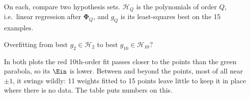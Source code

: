 \begin{center}
\end{center}

On each, compare two hypothesis sets. \(\mathcal{H}_Q\) is the polynomials of
order \(Q\), i.e.\ linear regression after \(\bm{\Phi}_Q\), and \(g_Q\) is its
least-squares best on the 15 examples.

\begin{question}
    Overfitting from best \(g_2 \in \mathcal{H}_2\) to best \(g_{10} \in
    \mathcal{H}_{10}\)?
\end{question}

\begin{center}
\end{center}

In both plots the red 10th-order fit passes closer to the points than the green
parabola, so its \(\Ein\) is lower. Between and beyond the points, most of all
near \(\pm 1\), it swings wildly: 11 weights fitted to 15 points leave little
to keep it in place where there is no data. The table puts numbers on this.

